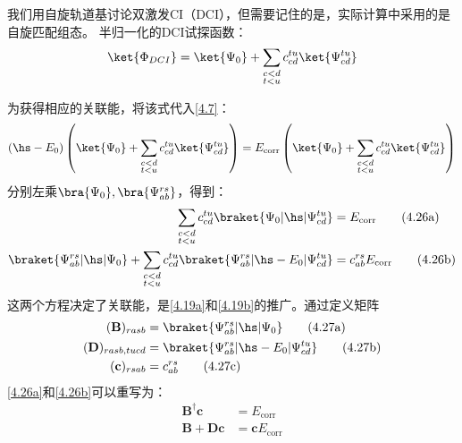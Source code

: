 我们用自旋轨道基讨论双激发CI（DCI），但需要记住的是，实际计算中采用的是自旋匹配组态。
半归一化的DCI试探函数：
\begin{align}
	\ket{\Phi_{DCI}}=\ket{\Psi_0}+\sum_{\substack{c<d\\t<u}}c_{cd}^{tu}\ket{\Psi_{cd}^{tu}}
\end{align}

为获得相应的关联能，将该式代入\autoref{4.7}：
\begin{align}
	(\hs - E_0)\left(\ket{\Psi_0}+\sum_{\substack{c<d\\t<u}}c_{cd}^{tu}\ket{\Psi_{cd}^{tu}}\right)
	=E_{\text{corr}}\left(\ket{\Psi_0}+\sum_{\substack{c<d\\t<u}}c_{cd}^{tu}\ket{\Psi_{cd}^{tu}}\right)
\end{align}
分别左乘$\bra{\Psi_0},\bra{\Psi_{ab}^{rs}}$，得到：
\begin{subequations}
	\begin{align}
		\sum_{\substack{c<d\\t<u}}c_{cd}^{tu} \braket{\Psi_0|\hs|\Psi^{tu}_{cd}}&=E_{\text{corr}} \tag{4.26a}\label{4.26a}\\
		\braket{\Psi^{rs}_{ab}|\hs|\Psi_0} + \sum_{\substack{c<d\\t<u}}c_{cd}^{tu} \braket{\Psi^{rs}_{ab}|\hs-E_0|\Psi^{tu}_{cd}}&=c_{ab}^{rs}E_{\text{corr}} \tag{4.26b}\label{4.26b}
	\end{align}
\end{subequations}
这两个方程决定了关联能，是\autoref{4.19a}和\autoref{4.19b}的推广。通过定义矩阵
\begin{subequations}
	\begin{align}
		(\mathbf{B})_{rasb}&=\braket{\Psi^{rs}_{ab}|\hs|\Psi_0}\tag{4.27a}\label{4.27a}\\
		(\mathbf{D})_{rasb, tucd}&=\braket{\Psi^{rs}_{ab}|\hs-E_0|\Psi^{tu}_{cd}}\tag{4.27b}\label{4.27b}\\
		(\mathbf{c})_{rsab}&=c_{ab}^{rs}\tag{4.27c}\label{4.27c}
	\end{align}
\end{subequations}
\autoref{4.26a}和\autoref{4.26b}可以重写为：
\begin{subequations}
	\begin{align}
		\mathbf{B}^\dagger\mathbf{c}&=E_{\text{corr}}\tag{4.28a}\label{4.28a}\\
		\mathbf{B}+\mathbf{Dc}&=\mathbf{c}E_{\text{corr}}\tag{4.28b}\label{4.28b}
	\end{align}
\end{subequations}
